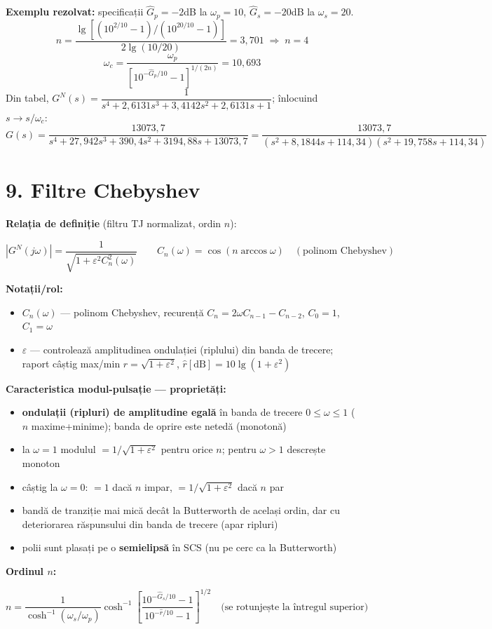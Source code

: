 \documentclass[10pt,a4paper]{article}
\begin{document}
\textbf{Exemplu rezolvat:} specificații $\hat G_p=-2$dB la $\omega_p=10$, $\hat G_s=-20$dB la $\omega_s=20$.
$$n=\dfrac{\lg\left[(10^{2/10}-1)/(10^{20/10}-1)\right]}{2\lg(10/20)}=3{,}701 \;\Rightarrow\; n=4$$
$$\omega_c=\dfrac{\omega_p}{\left[10^{-\hat G_p/10}-1\right]^{1/(2n)}}=10{,}693$$
Din tabel, $G^N(s)=\dfrac{1}{s^4+2{,}6131s^3+3{,}4142s^2+2{,}6131s+1}$; înlocuind $s\to s/\omega_c$:
$$G(s)=\dfrac{13073{,}7}{s^4+27{,}942s^3+390{,}4s^2+3194{,}88s+13073{,}7}=\dfrac{13073{,}7}{(s^2+8{,}1844s+114{,}34)(s^2+19{,}758s+114{,}34)}$$

\section*{9. Filtre Chebyshev}
\textbf{Relația de definiție} (filtru TJ normalizat, ordin $n$):
\begin{keyeq}\color{red!65!black}
$$|G^N(j\omega)|=\dfrac{1}{\sqrt{1+\varepsilon^2 C_n^2(\omega)}}\qquad C_n(\omega)=\cos(n\arccos\omega)\quad(\text{polinom Chebyshev})$$
\end{keyeq}
\textbf{Notații/rol:}
\begin{itemize}
\item $C_n(\omega)$ — polinom Chebyshev, recurență $C_n=2\omega C_{n-1}-C_{n-2}$, $C_0=1$, $C_1=\omega$
\item $\varepsilon$ — controlează amplitudinea ondulației (riplului) din banda de trecere; raport câștig max/min $r=\sqrt{1+\varepsilon^2}$, $\hat r[\mathrm{dB}]=10\lg(1+\varepsilon^2)$
\end{itemize}
\textbf{Caracteristica modul-pulsație — proprietăți:}
\begin{itemize}
\item \textbf{ondulații (ripluri) de amplitudine egală} în banda de trecere $0\le\omega\le1$ ($n$ maxime+minime); banda de oprire este netedă (monotonă)
\item la $\omega=1$ modulul $=1/\sqrt{1+\varepsilon^2}$ pentru orice $n$; pentru $\omega>1$ descrește monoton
\item câștig la $\omega=0$: $=1$ dacă $n$ impar, $=1/\sqrt{1+\varepsilon^2}$ dacă $n$ par
\item bandă de tranziție mai mică decât la Butterworth de același ordin, dar cu deteriorarea răspunsului din banda de trecere (apar ripluri)
\item polii sunt plasați pe o \textbf{semielipsă} în SCS (nu pe cerc ca la Butterworth)
\end{itemize}
\textbf{Ordinul $n$:}
\begin{keyeq}\color{red!65!black}
$$n=\dfrac{1}{\cosh^{-1}(\omega_s/\omega_p)}\cosh^{-1}\!\left[\dfrac{10^{-\hat G_s/10}-1}{10^{-\hat r/10}-1}\right]^{1/2}\quad\text{(se rotunjește la întregul superior)}$$
\end{keyeq}
\end{document}
